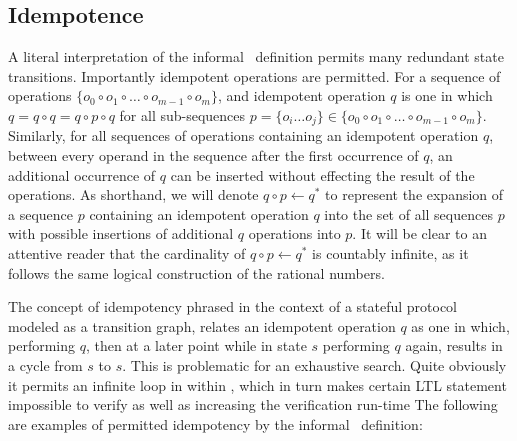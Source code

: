 \hypertarget{sec:idempotence}{%
\subsection{Idempotence}\label{sec:idempotence}}

A literal interpretation of the informal \CGKAsec\ definition permits many redundant state transitions.
Importantly idempotent operations are permitted.
For a sequence of operations \( \{ o_0 \circ o_{1} \circ \ldots \circ o_{m-1} \circ o_{m} \} \), and idempotent operation \(q\) is one in which \(q = q \circ q = q \circ p \circ q\) for all sub-sequences \(p = \{o_i \ldots o_j \} \in \{ o_0 \circ o_{1} \circ \ldots \circ o_{m-1} \circ o_{m} \} \).
Similarly, for all sequences of operations containing an idempotent operation \(q\), between every operand in the sequence after the first occurrence of \(q\), an additional occurrence of \(q\) can be inserted without effecting the result of the operations.
As shorthand, we will denote \(q \circ p \gets q^{*}\) to represent the expansion of a sequence \(p\) containing an idempotent operation \(q\) into the set of all sequences \(p\) with possible insertions of additional \(q\) operations into \(p\).
It will be clear to an attentive reader that the cardinality of \(q \circ p \gets q^{*}\) is countably infinite, as it follows the same logical construction of the rational numbers.

The concept of idempotency phrased in the context of a stateful protocol modeled as a transition graph, relates an idempotent operation \(q\) as one in which, performing \(q\), then at a later point while in state \(s\) performing \(q\) again, results in a cycle from \(s\) to \(s\).
This is problematic for an exhaustive search.
Quite obviously it permits an infinite loop in within \CGKAmod{}{}{}, which in turn makes certain LTL statement impossible to verify as well as increasing the verification run-time
The following are examples of permitted idempotency by the informal \CGKAsec\ definition:

